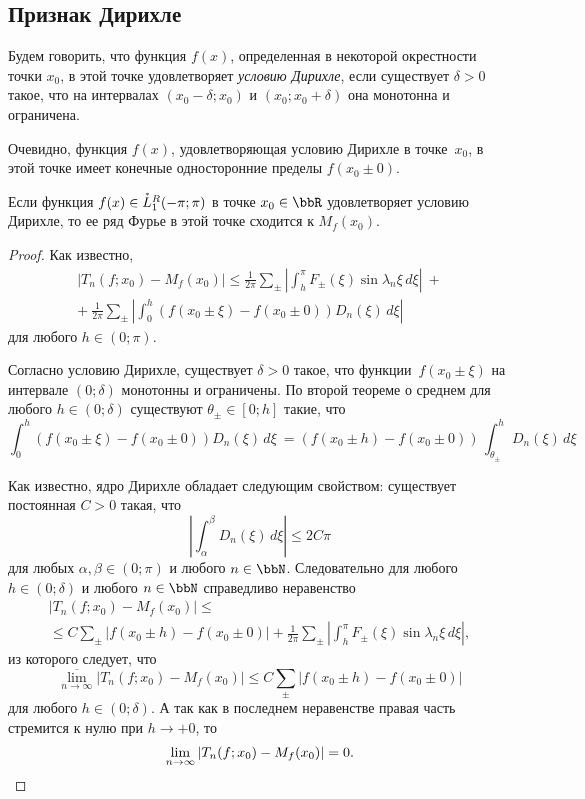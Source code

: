 
\subsection{Признак Дирихле}
Будем говорить, что функция $f(x)$, определенная в некоторой окрестности точки $x_0$, в этой точке удовлетворяет \textit{условию Дирихле}, если существует $\delta > 0$ такое, что на интервалах $(x_0 - \delta;x_0)$ и $(x_0;x_0 + \delta)$ она монотонна и ограничена.

Очевидно, функция $f(x)$, удовлетворяющая условию Дирихле в точке~$x_0$, в этой точке имеет конечные односторонние пределы $f(x_0\pm 0)$.
\begin{thm} \label{ch17thm5}
Если функция $f(x) \in \accentset{*}{L}^{R}_1(-\pi;\pi)$ в точке $x_0 \in \bbR$ удовлетворяет условию Дирихле, то ее ряд Фурье в этой точке сходится к $M_f(x_0)$.
\end{thm}
\begin{proof}
Как известно,
\begin{multline*}
|T_n(f; x_0) - M_f(x_0)| \le \frac{1}{2\pi} \sum_{\pm} \left|\int_{h}^{\pi} F_{\pm}(\xi) \sin{\lambda_n \xi} \,d\xi \right|\ +\\
+\ \frac{1}{2\pi} \sum_{\pm} \left|\int_{0}^{h} (f(x_0\pm \xi) - f(x_0\pm 0))D_n(\xi) \,d\xi \right|
\end{multline*}
для любого $h \in (0;\pi)$.

Согласно условию Дирихле, существует $\delta > 0$ такое, что функции~$f(x_0\pm \xi)$ на интервале $(0;\delta)$ монотонны и ограничены. По второй теореме о среднем для любого $h \in (0;\delta)$ существуют $\theta_{\pm} \in [0;h]$ такие, что
$$
\int_{0}^{h} (f(x_0\pm \xi) - f(x_0\pm 0))D_n(\xi) \,d\xi\ = (f(x_0\pm h) - f(x_0\pm 0))\, \int_{\theta_{\pm}}^{h} D_n(\xi)\,d\xi
$$

Как известно, ядро Дирихле обладает следующим свойством: существует постоянная $C > 0$ такая, что
$$
\left|\int_{\alpha}^{\beta} D_n(\xi)\,d\xi\right| \le 2C\pi
$$
для любых $\alpha, \beta \in (0;\pi)$ и любого $n \in \bbN$. Следовательно для любого $h \in (0;\delta)$ и любого $n \in \bbN$ справедливо неравенство
\begin{multline*}
|T_n(f; x_0) - M_f(x_0)| \le\\
\le C\sum_{\pm}|f(x_0\pm h) - f(x_0\pm 0)| + \frac{1}{2\pi} \sum_{\pm} \left|\int_{h}^{\pi} F_{\pm}(\xi) \sin{\lambda_n \xi} \,d\xi \right|,
\end{multline*}
из которого следует, что
$$
\overline{\lim\limits_{n \to \infty}}|T_n(f; x_0) - M_f(x_0)| \le C\sum_{\pm}|f(x_0\pm h) - f(x_0\pm 0)|
$$
для любого $h \in (0;\delta)$. А так как в последнем неравенстве правая часть стремится к нулю при $h \to +0$, то
\begin{equation*}
\lim\limits_{n \to \infty}|T_n(f; x_0) - M_f(x_0)| = 0. \qedhere
\end{equation*}
\end{proof}

